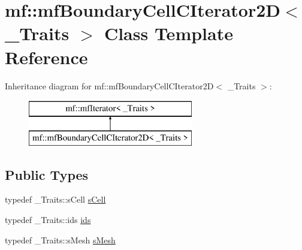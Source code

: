 \hypertarget{classmf_1_1mfBoundaryCellCIterator2D}{
\section{mf::mfBoundaryCellCIterator2D$<$ \_\-Traits $>$ Class Template Reference}
\label{classmf_1_1mfBoundaryCellCIterator2D}
}
Inheritance diagram for mf::mfBoundaryCellCIterator2D$<$ \_\-Traits $>$:\begin{figure}[H]
\begin{center}
\leavevmode
\includegraphics[height=2.000000cm]{classmf_1_1mfBoundaryCellCIterator2D}
\end{center}
\end{figure}
\subsection*{Public Types}
\begin{DoxyCompactItemize}
\item 
typedef \_\-Traits::sCell \hyperlink{classmf_1_1mfBoundaryCellCIterator2D_a0932e77a4d182a0c8a376b8ba1026e11}{sCell}
\item 
typedef \_\-Traits::ids \hyperlink{classmf_1_1mfBoundaryCellCIterator2D_a7b3c67238a3b4186e08f6fa05c11db31}{ids}
\item 
typedef \_\-Traits::sMesh \hyperlink{classmf_1_1mfBoundaryCellCIterator2D_a7cd4a533656715c1768db299fbd3e738}{sMesh}
\end{DoxyCompactItemize}
